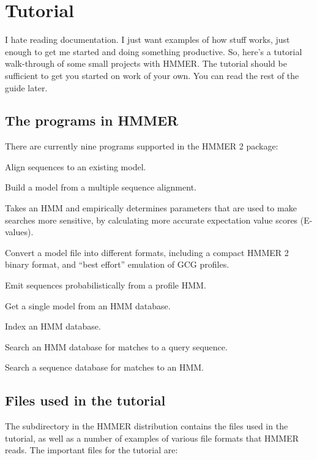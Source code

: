 \section{Tutorial}
\label{section:tutorial}

I hate reading documentation. I just want examples of how stuff works,
just enough to get me started and doing something productive. So,
here's a tutorial walk-through of some small projects with HMMER. The
tutorial should be sufficient to get you started on work of your
own. You can read the rest of the guide later.

\subsection {The programs in HMMER}

There are currently nine programs supported in the HMMER 2 package:

\begin{wideitem}
\item[\emprog{hmmalign}] Align sequences to an existing model.
\item[\emprog{hmmbuild}] Build a model from a multiple sequence alignment.
\item[\emprog{hmmcalibrate}] Takes an HMM and empirically determines
parameters that are used to make searches more sensitive, by
calculating more accurate expectation value scores (E-values).
\item[\emprog{hmmconvert}] Convert a model file into different formats,
including a compact HMMER 2 binary format, and ``best effort''
emulation of GCG profiles.
\item[\emprog{hmmemit}] Emit sequences probabilistically from a profile HMM.
\item[\emprog{hmmfetch}] Get a single model from an HMM database.
\item[\emprog{hmmindex}] Index an HMM database.
\item[\emprog{hmmpfam}] Search an HMM database for matches to a query sequence.
\item[\emprog{hmmsearch}] Search a sequence database for matches to an HMM.
\end{wideitem}

\subsection{Files used in the tutorial}

The subdirectory  in the HMMER distribution contains the
files used in the tutorial, as well as a number of examples of various
file formats that HMMER reads. The important files for the tutorial
are:

